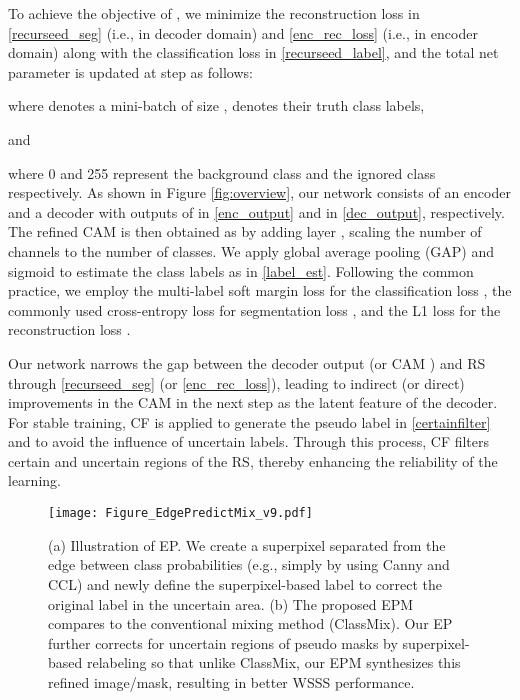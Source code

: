 \documentclass[11pt]{article}
\begin{document}
To achieve the objective of , we minimize the reconstruction loss in \eqref{recurseed_seg} {(i.e., in  decoder domain) and \eqref{enc_rec_loss} (i.e., in encoder domain)} along with the classification loss in \eqref{recurseed_label}, and the total net parameter  is updated at step  as follows:
\begin{small}

\end{small} 
where  denotes a mini-batch of size ,  denotes their truth class labels,  
\begin{small}

\end{small}
and 
\begin{small}

\end{small}
{where 0 and 255 represent the background class and the ignored class respectively.} As shown in Figure \ref{fig:overview}, our network consists of an encoder  and a decoder  with outputs of  in \eqref{enc_output} and  in \eqref{dec_output}, respectively. The refined CAM  is then obtained as  by adding layer , scaling the number of channels to the number of classes. We apply global average pooling (GAP) and sigmoid  to estimate the class labels as  in \eqref{label_est}. {Following the common practice, we employ the multi-label soft margin loss for the classification loss , the commonly used cross-entropy loss for segmentation loss , and the L1 loss for the reconstruction loss .}

Our network narrows the gap between the decoder output  (or CAM ) and RS  through \eqref{recurseed_seg} (or \eqref{enc_rec_loss}), leading to indirect (or direct) improvements in the CAM  in the next step as the latent feature of the decoder. For stable training, CF is applied to generate the pseudo label  in \eqref{certainfilter} and to avoid the influence of uncertain labels. Through this process, CF filters certain and uncertain regions of the RS, thereby enhancing the reliability of the learning.
        
\begin{figure}[t]\centering \texttt{[image: Figure\_EdgePredictMix\_v9.pdf]}
\caption{
        (a) Illustration of EP. We create a superpixel separated from the edge between class probabilities (e.g., simply by using Canny and CCL) and newly define the superpixel-based label to correct the original label in the uncertain area. (b) The proposed EPM compares to the conventional mixing method (ClassMix). Our EP  further corrects for uncertain regions of pseudo masks by superpixel-based relabeling so that unlike ClassMix, our EPM synthesizes this refined image/mask, resulting in better WSSS performance.   
    }
    \label{fig:ep}


\end{figure}
        
\end{document}
